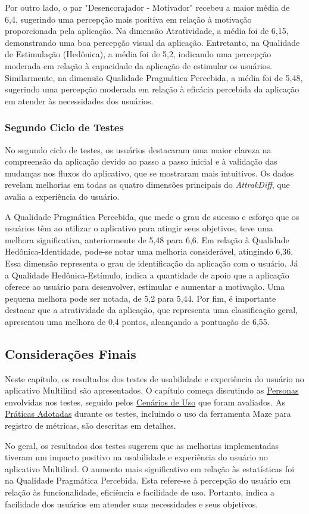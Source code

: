 Por outro lado, o par "Desencorajador - Motivador" recebeu a maior média de 6,4, sugerindo uma percepção mais positiva em relação à motivação proporcionada pela aplicação. Na dimensão Atratividade, a média foi de 6,15, demonstrando uma boa percepção visual da aplicação. Entretanto, 
na Qualidade de Estimulação (Hedônica), a média foi de 5,2, indicando uma percepção moderada em relação à capacidade da aplicação de estimular os usuários. Similarmente, na dimensão Qualidade Pragmática Percebida, a média foi de 5,48, sugerindo uma percepção moderada em relação à 
eficácia percebida da aplicação em atender às necessidades dos usuários.

\subsubsection{Segundo Ciclo de Testes}
\label{sec:Segundo Ciclo de Testes2}
No segundo ciclo de testes, os usuários destacaram uma maior clareza na compreensão da aplicação devido ao passo a passo inicial e à validação das mudanças nos fluxos do aplicativo, que se mostraram mais intuitivos. Os dados revelam melhorias em todas as quatro dimensões principais do 
\textit{AttrakDiff}, que avalia a experiência do usuário. 

A Qualidade Pragmática Percebida, que mede o grau de sucesso e esforço que os usuários têm ao utilizar o aplicativo para atingir seus objetivos, teve uma melhora significativa, anteriormente de 5,48 para 6,6. Em relação à 
Qualidade Hedônica-Identidade, pode-se notar uma melhoria considerável, atingindo 6,36. Essa dimensão representa o grau de identificação da aplicação com o usuário. Já a Qualidade Hedônica-Estímulo, indica a quantidade de apoio que a aplicação oferece ao usuário 
para desenvolver, estimular e aumentar a motivação. Uma pequena melhora pode ser notada, de 5,2 para 5,44. Por fim, é importante destacar que a atratividade da aplicação, que representa uma classificação geral, apresentou uma melhora de 0,4 pontos, alcançando a 
pontuação de 6,55.

\subsection{Considerações Finais}
\label{sec:Considerações Finais}
Neste capítulo, os resultados dos testes de usabilidade e experiência do usuário no aplicativo Multilind são apresentados. O capítulo começa discutindo as \hyperref[sec:Personas]{Personas} envolvidas nos testes, seguido pelos \hyperref[sec:Cenários de Uso]{Cenários de Uso} que foram avaliados. 
As \hyperref[sec:Práticas Adotadas]{Práticas Adotadas} durante os testes, incluindo o uso da ferramenta Maze para registro de métricas, são descritas em detalhes.

No geral, os resultados dos testes sugerem que as melhorias implementadas tiveram um impacto positivo na usabilidade e experiência do usuário no aplicativo Multilind. O aumento mais significativo em relação às estatísticas foi na Qualidade Pragmática Percebida. Esta refere-se à percepção 
do usuário em relação às funcionalidade, eficiência e facilidade de uso. Portanto, indica a facilidade dos usuários em atender suas necessidades e seus objetivos.